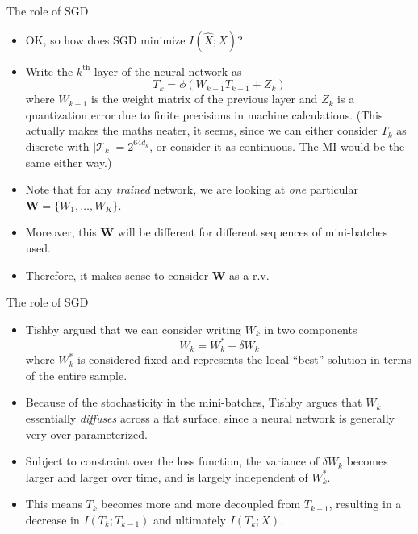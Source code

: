 \documentclass{beamer}
\begin{document}
\begin{frame}{The role of SGD}
\begin{itemize}
	\item OK, so how does SGD minimize $I(\hat{X};X)$? 
	\item Write the $k^{\text{th}}$ layer of the neural network as 
	\[
	T_{k} = \phi(W_{k-1}T_{k-1} + Z_k)
	\]
	where $W_{k-1}$ is the weight matrix of the previous layer and $Z_k$ is a quantization error due to finite precisions in machine calculations. (This actually makes the maths neater, it seems, since we can either consider $T_k$ as discrete with $|\mathcal{T}_k|=2^{64d_k}$, or consider it as continuous. The MI would be the same either way.)
	\item Note that for any \emph{trained} network, we are looking at \emph{one} particular $\boldsymbol{W} = \{W_1, \ldots, W_K\}$. 
	\item Moreover, this $\boldsymbol{W}$ will be different for different sequences of mini-batches used. 
	\item Therefore, it makes sense to consider $\boldsymbol{W}$ as a r.v.
\end{itemize}
\end{frame}

\begin{frame}{The role of SGD}
\begin{itemize}
	\item Tishby argued that we can consider writing $W_k$ in two components
	\[
		W_k = W^*_k + \delta W_k
	\]
	where $W^*_k$ is considered fixed and represents the local ``best'' solution in terms of the entire sample. 
	\item Because of the stochasticity in the mini-batches, Tishby argues that $W_k$ essentially \emph{diffuses} across a flat surface, since a neural network is generally very over-parameterized. 
	\item Subject to constraint over the loss function, the variance of $\delta W_k$ becomes larger and larger over time, and is largely independent of $W^*_k$. 
	\item This means $T_k$ becomes more and more decoupled from $T_{k-1}$, resulting in a decrease in $I(T_k;T_{k-1})$ and ultimately $I(T_k; X)$. 
\end{itemize}
\end{frame}
\end{document}
